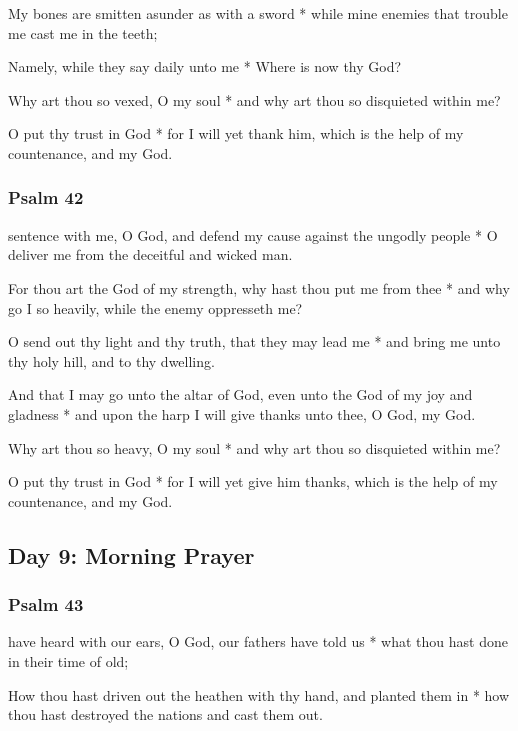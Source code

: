 My bones are smitten asunder as with a sword * while mine enemies that trouble me cast me in the teeth;

Namely, while they say daily unto me * Where is now thy God?

Why art thou so vexed, O my soul * and why art thou so disquieted within me?

O put thy trust in God * for I will yet thank him, which is the help of my countenance, and my God.

\subsubsection{Psalm 42}


 sentence with me, O God, and defend my cause against the ungodly people * O deliver me from the deceitful and wicked man.

For thou art the God of my strength, why hast thou put me from thee * and why go I so heavily, while the enemy oppresseth me?

O send out thy light and thy truth, that they may lead me * and bring me unto thy holy hill, and to thy dwelling.

And that I may go unto the altar of God, even unto the God of my joy and gladness * and upon the harp I will give thanks unto thee, O God, my God.

Why art thou so heavy, O my soul * and why art thou so disquieted within me?

O put thy trust in God * for I will yet give him thanks, which is the help of my countenance, and my God.

\subsection{Day 9: Morning Prayer}

\subsubsection{Psalm 43}


 have heard with our ears, O God, our fathers have told us * what thou hast done in their time of old;

How thou hast driven out the heathen with thy hand, and planted them in * how thou hast destroyed the nations and cast them out.

